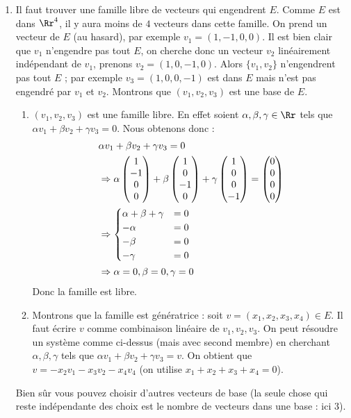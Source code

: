 {{\begin{enumerate}
\item Il faut trouver une famille libre de vecteurs qui engendrent
  $E$. Comme $E$ est dans $\Rr^4$, il y aura moins de $4$ vecteurs
  dans cette famille. On prend un vecteur de $E$ (au hasard), par
  exemple $v_1 = (1,-1,0,0)$. Il est bien clair que $v_1$ n'engendre
  pas tout $E$, on cherche donc un vecteur $v_2$ lin\'eairement
  ind\'ependant de $v_1$, prenons $v_2 = (1,0,-1,0)$. Alors $\{v_1,v_2\}$
  n'engendrent pas tout $E$ ; par exemple $v_3 = (1,0,0,-1)$ est dans $E$
  mais n'est pas engendr\'e par $v_1$ et $v_2$. Montrons que
  $(v_1,v_2,v_3)$ est une base de $E$.
  \begin{enumerate}
  \item $(v_1,v_2,v_3)$ est une famille libre. En effet soient
    $\alpha,\beta,\gamma \in \Rr$ tels que $\alpha v_1+\beta
    v_2+\gamma v_3=0$. Nous obtenons donc :
\begin{align*}
& \alpha v_1+\beta v_2+\gamma v_3=0 \\
&\Rightarrow \alpha \begin{pmatrix}1 \cr -1 \cr 0 \cr 0 \cr
\end{pmatrix} + \beta
 \begin{pmatrix}1 \cr 0 \cr -1 \cr 0 \cr \end{pmatrix} + \gamma 
\begin{pmatrix}1 \cr 0 \cr 0 \cr -1 \cr \end{pmatrix}= 
\begin{pmatrix}0 \cr 0 \cr 0 \cr 0 \cr \end{pmatrix} \\
 &\Rightarrow \begin{cases}
  \alpha+\beta +\gamma &= 0 \\
  -\alpha &= 0 \\
  -\beta &=  0 \\
  -\gamma &=  0 \\
\end{cases}\\
 &\Rightarrow \alpha=0, \beta=0, \gamma = 0 \\
\end{align*}
Donc la famille est libre.

\item Montrons que la famille est g\'en\'eratrice : soit $v =
  (x_1,x_2,x_3,x_4) \in E$. Il faut \'ecrire $v$ comme combinaison
  lin\'eaire de $v_1,v_2,v_3$.  On peut r\'esoudre un syst\`eme comme
  ci-dessus (mais avec second membre) en cherchant
  $\alpha,\beta,\gamma$ tels que $\alpha v_1+\beta v_2+\gamma v_3=v$.
  On obtient que $v = -x_2v_1-x_3v_2-x_4v_4$ (on utilise
  $x_1+x_2+x_3+x_4=0$).
  \end{enumerate}
  
  Bien s\^ur vous pouvez choisir d'autres vecteurs de base (la seule
  chose qui reste ind\'ependante des choix est le nombre de vecteurs
  dans une base : ici $3$).
\end{enumerate}}
}